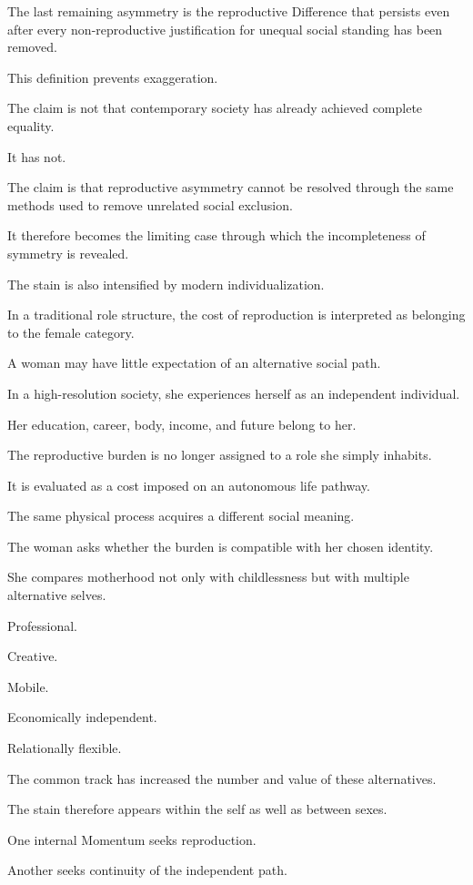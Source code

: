 The last remaining asymmetry is the reproductive Difference that persists even after every non-reproductive justification for unequal social standing has been removed.

This definition prevents exaggeration.

The claim is not that contemporary society has already achieved complete equality.

It has not.

The claim is that reproductive asymmetry cannot be resolved through the same methods used to remove unrelated social exclusion.

It therefore becomes the limiting case through which the incompleteness of symmetry is revealed.

The stain is also intensified by modern individualization.

In a traditional role structure, the cost of reproduction is interpreted as belonging to the female category.

A woman may have little expectation of an alternative social path.

In a high-resolution society, she experiences herself as an independent individual.

Her education, career, body, income, and future belong to her.

The reproductive burden is no longer assigned to a role she simply inhabits.

It is evaluated as a cost imposed on an autonomous life pathway.

The same physical process acquires a different social meaning.

The woman asks whether the burden is compatible with her chosen identity.

She compares motherhood not only with childlessness but with multiple alternative selves.

Professional.

Creative.

Mobile.

Economically independent.

Relationally flexible.

The common track has increased the number and value of these alternatives.

The stain therefore appears within the self as well as between sexes.

One internal Momentum seeks reproduction.

Another seeks continuity of the independent path.

